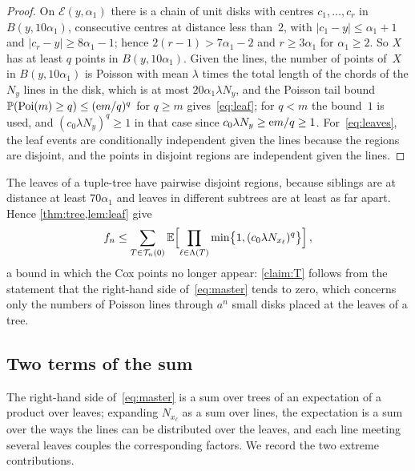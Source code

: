 \documentclass[11pt,letterpaper]{article}
\renewcommand{\cE}{\mathcal E}
\begin{document}
\begin{proof}
On $\cE(y,\alpha_1)$ there is a chain of unit disks with centres $c_1,\dots,c_r$ in $B(y,10\alpha_1)$, consecutive centres at distance less than~$2$, with $\lvert c_1-y\rvert\le\alpha_1+1$ and $\lvert c_r-y\rvert\ge8\alpha_1-1$; hence $2(r-1)>7\alpha_1-2$ and $r\ge3\alpha_1$ for $\alpha_1\ge2$. So $X$ has at least $q$ points in $B(y,10\alpha_1)$. Given the lines, the number of points of~$X$ in $B(y,10\alpha_1)$ is Poisson with mean $\lambda$ times the total length of the chords of the $N_y$ lines in the disk, which is at most $20\alpha_1\lambda N_y$, and the Poisson tail bound $\mathbb P(\mathrm{Poi}(m)\ge q)\le(\mathrm{e} m/q)^q$ for $q\ge m$ gives~\eqref{eq:leaf}; for $q<m$ the bound~$1$ is used, and $(c_0\lambda N_y)^q\ge1$ in that case since $c_0\lambda N_y\ge\mathrm{e} m/q\ge1$. For~\eqref{eq:leaves}, the leaf events are conditionally independent given the lines because the regions are disjoint, and the points in disjoint regions are independent given the lines.
\end{proof}

The leaves of a tuple-tree have pairwise disjoint regions, because siblings are at distance at least $70\alpha_1$ and leaves in different subtrees are at least as far apart. Hence \cref{thm:tree,lem:leaf} give
\begin{equation}
\label{eq:master}
  f_n\le\sum_{T\in\mathcal T_n(0)}\mathbb E\Bigl[\prod_{\ell\in\Lambda(T)}\min\bigl\{1,(c_0\lambda N_{x_\ell})^{q}\bigr\}\Bigr]\,,
\end{equation}
a bound in which the Cox points no longer appear: \cref{claim:T} follows from the statement that the right-hand side of~\eqref{eq:master} tends to zero, which concerns only the numbers of Poisson lines through $a^n$ small disks placed at the leaves of a tree.

\subsection{Two terms of the sum}

The right-hand side of~\eqref{eq:master} is a sum over trees of an expectation of a product over leaves; expanding $N_{x_\ell}$ as a sum over lines, the expectation is a sum over the ways the lines can be distributed over the leaves, and each line meeting several leaves couples the corresponding factors. We record the two extreme contributions.
\end{document}
